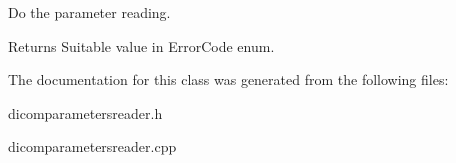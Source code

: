 Do the parameter reading. 

\begin{DoxyReturn}{Returns}
Suitable value in Error\+Code enum. 
\end{DoxyReturn}


The documentation for this class was generated from the following files\+:\begin{DoxyCompactItemize}
\item 
dicomparametersreader.\+h\item 
dicomparametersreader.\+cpp\end{DoxyCompactItemize}
